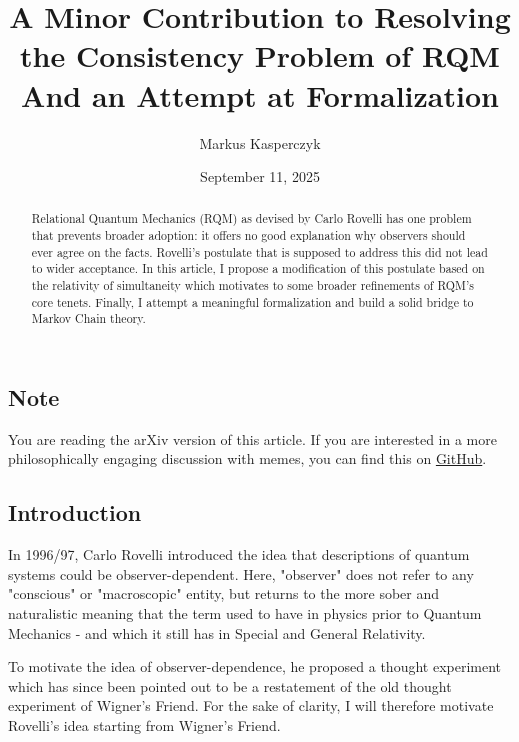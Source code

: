 \documentclass{article}
\title{A Minor Contribution to Resolving the Consistency Problem of RQM \\ \large And an Attempt at Formalization}
\author{Markus Kasperczyk}
\date{September 11, 2025}
\begin{document}
\maketitle

\newpage

\begin{abstract}

Relational Quantum Mechanics (RQM) as devised by Carlo Rovelli has one problem that prevents broader adoption: it offers no good explanation why observers should ever agree on the facts. Rovelli's postulate that is supposed to address this did not lead to wider acceptance. In this article, I propose a modification of this postulate based on the relativity of simultaneity which motivates to some broader refinements of RQM's core tenets. Finally, I attempt a meaningful formalization and build a solid bridge to Markov Chain theory.

\end{abstract}

\newpage

\subsection*{Note}

You are reading the arXiv version of this article. If you are interested in a more philosophically engaging discussion with memes, you can find this on \href{https://github.com/GermanBrainRot/Project-Galileo/tree/for-western-audiences}{GitHub}.

\newpage

\tableofcontents

\pagebreak

\subsection*{Introduction}

In 1996/97, Carlo Rovelli introduced \cite{Rovelli_1996} the idea that descriptions of quantum systems could be observer-dependent. Here, "observer" does not refer to any "conscious" or "macroscopic" entity, but returns to the more sober and naturalistic meaning that the term used to have in physics prior to Quantum Mechanics - and which it still has in Special and General Relativity.

To motivate the idea of observer-dependence, he proposed a thought experiment which has since been pointed out \cite{laudisa2017openproblemsrelationalquantum} to be a restatement of the old thought experiment of Wigner's Friend. For the sake of clarity, I will therefore motivate Rovelli's idea starting from Wigner's Friend.
\end{document}
